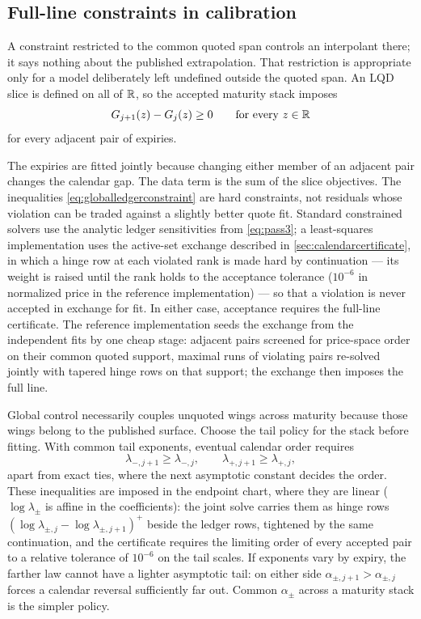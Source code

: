 \subsection{Full-line constraints in calibration}
\label{sec:globalcalendarfit}

A constraint restricted to the common quoted span controls an interpolant
there; it says nothing about the published extrapolation.  That restriction is
appropriate only for a model deliberately left undefined outside the quoted
span.  An LQD slice is defined on all of $\mathbb{R}$, so the accepted maturity stack
imposes
\begin{equation}
G_{j+1}(z)-G_j(z)\ge0
\qquad\text{for every }z\in\mathbb{R}
\label{eq:globalledgerconstraint}
\end{equation}
for every adjacent pair of expiries.

The expiries are fitted jointly because changing either member of an adjacent
pair changes the calendar gap.  The data term is the sum of the slice
objectives.  The inequalities \eqref{eq:globalledgerconstraint} are hard
constraints, not residuals whose violation can be traded against a slightly
better quote fit.  Standard constrained solvers use the analytic ledger
sensitivities from \eqref{eq:pass3}; a least-squares implementation uses
the active-set exchange described in \cref{sec:calendarcertificate},
in which a hinge row at each violated rank is made hard by continuation
--- its weight is raised until the rank holds to the acceptance
tolerance ($10^{-6}$ in normalized price in the reference
implementation) --- so that a violation is never accepted in exchange
for fit.  In either case, acceptance requires the full-line certificate.
The reference implementation seeds the exchange from the independent
fits by one cheap stage: adjacent pairs screened for price-space order
on their common quoted support, maximal runs of violating pairs
re-solved jointly with tapered hinge rows on that support; the exchange
then imposes the full line.

Global control necessarily couples unquoted wings across maturity because
those wings belong to the published surface.  Choose the tail policy for the
stack before fitting.  With common tail exponents, eventual calendar order
requires
\begin{equation}
\lambda_{-,j+1}\ge\lambda_{-,j},
\qquad
\lambda_{+,j+1}\ge\lambda_{+,j},
\label{eq:tailscalecalendar}
\end{equation}
apart from exact ties, where the next asymptotic constant decides the order.
These inequalities are imposed in the endpoint chart, where they are
linear ($\log\lambda_\pm$ is affine in the coefficients): the joint
solve carries them as hinge rows
$(\log\lambda_{\pm,j}-\log\lambda_{\pm,j+1})^+$ beside the ledger rows,
tightened by the same continuation, and the certificate requires the
limiting order of every accepted pair to a relative tolerance of
$10^{-6}$ on the tail scales.  If exponents vary by
expiry, the farther law cannot have a lighter asymptotic tail: on either side
$\alpha_{\pm,j+1}>\alpha_{\pm,j}$ forces a calendar reversal sufficiently far
out.  Common $\alpha_\pm$ across a maturity stack is the simpler policy.

